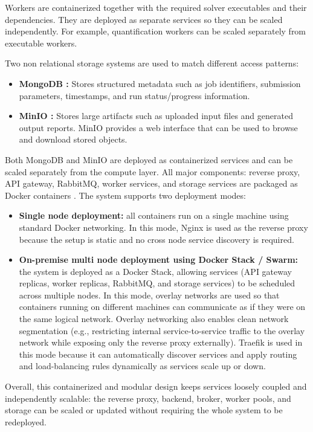 Workers are containerized together with the required solver executables and their dependencies. They are deployed as separate services so they can be scaled independently. For example, quantification workers can be scaled separately from executable workers.

Two non relational storage systems are used to match different access patterns:
\begin{itemize}
    \item \textbf{MongoDB \cite{MongoDB}:} Stores structured metadata such as job identifiers, submission parameters, timestamps, and run status/progress information.
    \item \textbf{MinIO \cite{minio}:} Stores large artifacts such as uploaded input files and generated output reports. MinIO provides a web interface that can be used to browse and download stored objects.
\end{itemize}
Both MongoDB and MinIO are deployed as containerized services and can be scaled separately from the compute layer. All major components: reverse proxy, API gateway, RabbitMQ, worker services, and storage services are packaged as Docker containers \cite{docker}. The system supports two deployment modes:

\begin{itemize}
    \item \textbf{Single node deployment:} all containers run on a single machine using standard Docker networking. In this mode, Nginx is used as the reverse proxy because the setup is static and no cross node service discovery is required.

    \item \textbf{On-premise multi node deployment using Docker Stack / Swarm:} the system is deployed as a Docker Stack, allowing services (API gateway replicas, worker replicas, RabbitMQ, and storage services) to be scheduled across multiple nodes. In this mode, overlay networks are used so that containers running on different machines can communicate as if they were on the same logical network. Overlay networking also enables clean network segmentation (e.g., restricting internal service-to-service traffic to the overlay network while exposing only the reverse proxy externally). Traefik is used in this mode because it can automatically discover services and apply routing and load-balancing rules dynamically as services scale up or down.
\end{itemize}

Overall, this containerized and modular design keeps services loosely coupled and independently scalable: the reverse proxy, backend, broker, worker pools, and storage can be scaled or updated without requiring the whole system to be redeployed.

